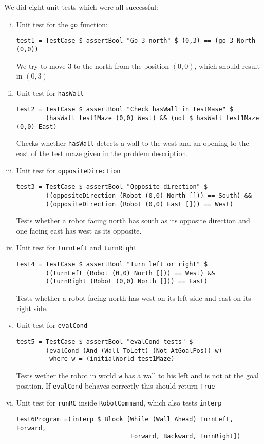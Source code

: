 \documentclass[a4paper,10pt]{article}
\begin{document}
We did eight unit tests which were all successful:
\begin{enumerate}[i.]
\item Unit test for the \verb=go= function:
\begin{verbatim}
test1 = TestCase $ assertBool "Go 3 north" $ (0,3) == (go 3 North (0,0))
\end{verbatim}
We try to move 3 to the north from the position $(0,0)$, which should result in $(0,3)$

\item Unit test for \verb=hasWall=
\begin{verbatim}
test2 = TestCase $ assertBool "Check hasWall in testMase" $ 
        (hasWall test1Maze (0,0) West) && (not $ hasWall test1Maze (0,0) East)
\end{verbatim}
Checks whether \verb=hasWall= detects a wall to the west and an opening to the east of the test maze given in the problem description.

\item Unit test for \verb=oppositeDirection=
\begin{verbatim}
test3 = TestCase $ assertBool "Opposite direction" $ 
        ((oppositeDirection (Robot (0,0) North [])) == South) && 
        ((oppositeDirection (Robot (0,0) East [])) == West)
\end{verbatim}
Tests whether a robot facing north has south as its opposite direction and one facing east has west as its opposite.

\item Unit test for \verb=turnLeft= and \verb=turnRight=
\begin{verbatim}
test4 = TestCase $ assertBool "Turn left or right" $ 
        ((turnLeft (Robot (0,0) North [])) == West) && 
        ((turnRight (Robot (0,0) North [])) == East)
\end{verbatim}
Tests whether a robot facing north has west on its left side and east on its right side.

\item Unit test for \verb=evalCond=
\begin{verbatim}
test5 = TestCase $ assertBool "evalCond tests" $ 
        (evalCond (And (Wall ToLeft) (Not AtGoalPos)) w)
         where w = (initialWorld test1Maze)
\end{verbatim}
Tests wether the robot in world \verb=w= has a wall to his left and is not at the goal position. If \verb=evalCond= behaves correctly this should return \verb=True=

\item Unit test for \verb=runRC= inside \verb=RobotCommand=, which also tests \verb=interp=
\begin{verbatim}
test6Program =(interp $ Block [While (Wall Ahead) TurnLeft, Forward, 
                               Forward, Backward, TurnRight])


\end{verbatim}
\end{enumerate}
\end{document}
